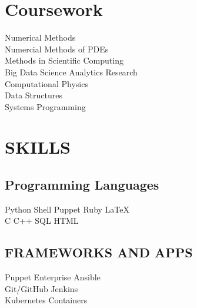 \documentclass[]{deedy-resume-openfont}
\begin{document}
\begin{minipage}[t]{0.33\textwidth}

\section{Coursework}
Numerical Methods \\
Numercial Methods of PDEs \\
Methods in Scientific Computing \\
Big Data Science Analytics Research \\
Computational Physics \\
Data Structures \\
Systems Programming \\
\sectionsep


\section{SKILLS}
\subsection{Programming Languages}
Python \textbullet{}   Shell \textbullet{} Puppet \textbullet{}
Ruby \textbullet{} \LaTeX\ \\ 
C \textbullet{} C++ \textbullet{} SQL \textbullet{} HTML
\sectionsep

\subsection{FRAMEWORKS AND APPS} 
    Puppet Enterprise \textbullet{} Ansible \\
    Git/GitHub \textbullet{} Jenkins \\
    Kubernetes \textbullet{} Containers
\sectionsep
\newpage

%
%

\end{minipage}
\hfill
\end{document}
